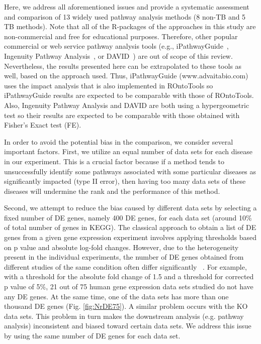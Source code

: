 Here, we address all aforementioned issues and provide a systematic assessment and comparison of 13 widely used pathway analysis methods (8 non-TB and 5 TB methods). 
Note that all of the R-packages of the approaches in this study are non-commercial and free for educational purposes. 
Therefore, other popular commercial or web service pathway analysis tools (e.g., iPathwayGuide~\cite{ahsan2017identifying}, Ingenuity Pathway Analysis~\cite{kramer2013causal}, or DAVID~\cite{huang2008systematic}) are out of scope of this review. Nevertheless, the results presented here can be extrapolated to these tools as well, based on the approach used. Thus, iPathwayGuide (www.advaitabio.com) uses the impact analysis that is also implemented in ROntoTools so iPathwayGuide results are expected to be comparable with those of ROntoTools. Also, Ingenuity Pathway Analysis and DAVID are both using a hypergeometric test so their results are expected to be comparable with those obtained with Fisher's Exact test (FE).
 
In order to avoid the potential bias in the comparison, we consider several important factors. 
First, we utilize an equal number of data sets for each disease in our experiment.
This is a crucial factor because if a method tends to unsuccessfully identify some pathways associated with some particular diseases as significantly impacted (type II error), then having too many data sets of these diseases will undermine the rank and the performance of this method.

Second, we attempt to reduce the bias caused by different data sets by selecting a fixed number of DE genes, namely 400 DE genes, for each data set (around 10\% of total number of genes in KEGG).
The classical approach to obtain a list of DE genes from a given gene expression experiment involves applying thresholds based on p value and absolute log-fold changes.
However, due to the heterogeneity present in the individual experiments, the number of DE genes obtained from different studies of the same condition often differ significantly ~\cite{Draghici:2006, tan2003evaluation, ein2005outcome}.
For example, with a threshold for the absolute fold change of 1.5 and a threshold  for corrected p value of 5\%, 21 out of 75 human gene expression data sets studied do not have any DE genes. At the same time,  one of the data sets has more than one thousand DE genes (Fig. \ref{fig:NrDE75}). 
A similar problem occurs with the KO data sets. %
This problem in turn makes the downstream analysis (e.g. pathway analysis) inconsistent and biased toward certain data sets. We address this issue by using the same number of DE genes for each data set.

